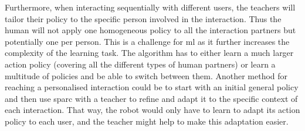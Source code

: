 Furthermore, when interacting sequentially with different users, the teachers will tailor their policy to the specific person involved in the interaction. Thus the human will not apply one homogeneous policy to all the interaction partners but potentially one per person. 
This is a challenge for \gls{ml} as it further increases the complexity of the learning task. The algorithm has to either learn a much larger action policy (covering all the different types of human partners) or learn a multitude of policies and be able to switch between them. Another method for reaching a personalised interaction could be to start with an initial general policy and then use \gls{sparc} with a teacher to refine and adapt it to the specific context of each interaction. That way, the robot would only have to learn to adapt its action policy to each user, and the teacher might help to make this adaptation easier.



